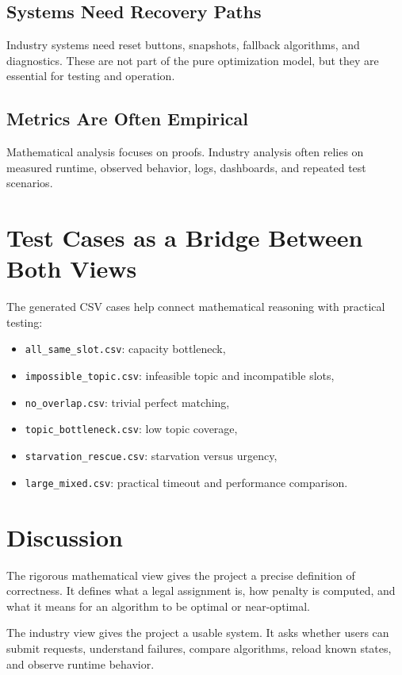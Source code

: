 \documentclass[12pt,a4paper]{article}
\begin{document}
\subsection{Systems Need Recovery Paths}

Industry systems need reset buttons, snapshots, fallback algorithms, and diagnostics. These are not part of the pure optimization model, but they are essential for testing and operation.

\subsection{Metrics Are Often Empirical}

Mathematical analysis focuses on proofs. Industry analysis often relies on measured runtime, observed behavior, logs, dashboards, and repeated test scenarios.

\section{Test Cases as a Bridge Between Both Views}

The generated CSV cases help connect mathematical reasoning with practical testing:

\begin{itemize}[noitemsep]
    \item \texttt{all\_same\_slot.csv}: capacity bottleneck,
    \item \texttt{impossible\_topic.csv}: infeasible topic and incompatible slots,
    \item \texttt{no\_overlap.csv}: trivial perfect matching,
    \item \texttt{topic\_bottleneck.csv}: low topic coverage,
    \item \texttt{starvation\_rescue.csv}: starvation versus urgency,
    \item \texttt{large\_mixed.csv}: practical timeout and performance comparison.
\end{itemize}

\section{Discussion}

The rigorous mathematical view gives the project a precise definition of correctness. It defines what a legal assignment is, how penalty is computed, and what it means for an algorithm to be optimal or near-optimal.

The industry view gives the project a usable system. It asks whether users can submit requests, understand failures, compare algorithms, reload known states, and observe runtime behavior.
\end{document}
